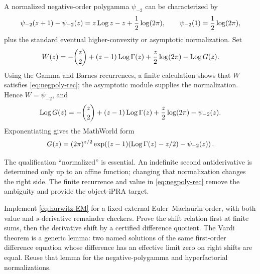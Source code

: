 A normalized negative-order polygamma \(\psi_{-2}\) can be characterized by
\begin{equation}\label{eq:negpoly-rec}
 \psi_{-2}(z+1)-\psi_{-2}(z)
 =z\operatorname{Log} z-z+\frac12\log(2\pi),
 \qquad
 \psi_{-2}(1)=\frac12\log(2\pi),
\end{equation}
plus the standard eventual higher-convexity or asymptotic normalization.  Set
\begin{equation}\label{eq:negpoly-expression}
 W(z)=-\binom z2+(z-1)\operatorname{Log}\Gamma(z)
      +\frac z2\log(2\pi)-\operatorname{Log} G(z).
\end{equation}
Using the Gamma and Barnes recurrences, a finite calculation shows that \(W\)
satisfies \cref{eq:negpoly-rec}; the asymptotic module supplies the normalization.
Hence \(W=\psi_{-2}\), and
\begin{equation}\label{eq:negative-polygamma}
 \operatorname{Log} G(z)=
 -\binom z2+(z-1)\operatorname{Log}\Gamma(z)
 +\frac z2\log(2\pi)-\psi_{-2}(z).
\end{equation}
Exponentiating gives the MathWorld form
\begin{equation}\label{eq:negative-polygamma-exp}
 G(z)=(2\pi)^{z/2}
 \exp\!\left((z-1)(\operatorname{Log}\Gamma(z)-z/2)-\psi_{-2}(z)\right).
\end{equation}

The qualification ``normalized'' is essential.  An indefinite second
antiderivative is determined only up to an affine function; changing that
normalization changes the right side.  The finite recurrence and value in
\cref{eq:negpoly-rec} remove the ambiguity and provide the object-iPRA target.

\begin{roadmap}
Implement \cref{eq:hurwitz-EM} for a fixed external Euler--Maclaurin order, with
both value and \(s\)-derivative remainder checkers.  Prove the shift relation
first at finite sums, then the derivative shift by a certified difference
quotient.  The Vardi theorem is a generic lemma: two named solutions of the
same first-order difference equation whose difference has an effective limit
zero on right shifts are equal.  Reuse that lemma for the negative-polygamma
and hyperfactorial normalizations.
\end{roadmap}
